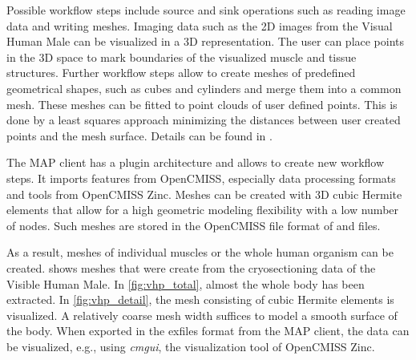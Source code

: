 Possible workflow steps include source and sink operations such as reading image data and writing meshes. Imaging data such as the 2D images from the Visual Human Male can be visualized in a 3D representation. The user can place points in the 3D space to mark boundaries of the visualized muscle and tissue structures.
Further workflow steps allow to create meshes of predefined geometrical shapes, such as cubes and cylinders and merge them into a common mesh. These meshes can be fitted to point clouds of user defined points. This is done by a least squares approach minimizing the distances between user created points and the mesh surface. Details can be found in \cite{Fernandez2018}.

The MAP client has a plugin architecture and allows to create new workflow steps. It imports features from OpenCMISS, especially data processing formats and tools from OpenCMISS Zinc. Meshes can be created with 3D cubic Hermite elements that allow for a high geometric modeling flexibility with a low number of nodes. Such meshes are stored in the OpenCMISS file format of  and  files.

As a result, meshes of individual muscles or the whole human organism can be created.  shows meshes that were create from the cryosectioning data of the Visible Human Male. In \cref{fig:vhp_total}, almost the whole body has been extracted. In \cref{fig:vhp_detail}, the mesh consisting of cubic Hermite elements is visualized. A relatively coarse mesh width suffices to model a smooth surface of the body. When exported in the exfiles format from the MAP client, the data can be visualized, e.g., using \emph{cmgui}, the visualization tool of OpenCMISS Zinc.

